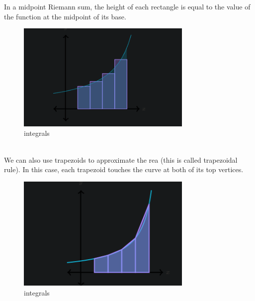 \documentclass{article}
\begin{document}
            In a midpoint Riemann sum, the height of each rectangle is equal to the value of the function at the midpoint of its base.\\
            \begin{figure}[ht]
                \centering
                \includegraphics[bb=0 0 355 244, width=0.75\textwidth]{images/mid_riem.png}
                \caption{integrals}\label{fig:midpoint Reimann}
            \end{figure} \\
            We can also use trapezoids to approximate the rea (this is called trapezoidal rule). In this case, each trapezoid touches the curve at both of its top vertices.\\
            \begin{figure}[ht]
                \centering
                \includegraphics[bb=0 0 355 244, width=0.75\textwidth]{images/trap_rule.png}
                \caption{integrals}\label{fig:trapezoid rule}
            \end{figure} \\
           
\end{document}

